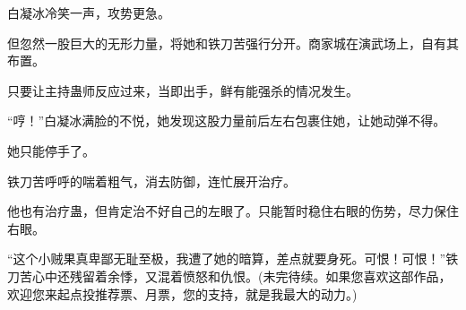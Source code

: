 \begin{this_body}
白凝冰冷笑一声，攻势更急。

但忽然一股巨大的无形力量，将她和铁刀苦强行分开。商家城在演武场上，自有其布置。

只要让主持蛊师反应过来，当即出手，鲜有能强杀的情况发生。

“哼！”白凝冰满脸的不悦，她发现这股力量前后左右包裹住她，让她动弹不得。

她只能停手了。

铁刀苦呼呼的喘着粗气，消去防御，连忙展开治疗。

他也有治疗蛊，但肯定治不好自己的左眼了。只能暂时稳住右眼的伤势，尽力保住右眼。

“这个小贼果真卑鄙无耻至极，我遭了她的暗算，差点就要身死。可恨！可恨！”铁刀苦心中还残留着余悸，又混着愤怒和仇恨。(未完待续。如果您喜欢这部作品，欢迎您来起点投推荐票、月票，您的支持，就是我最大的动力。)

\end{this_body}

